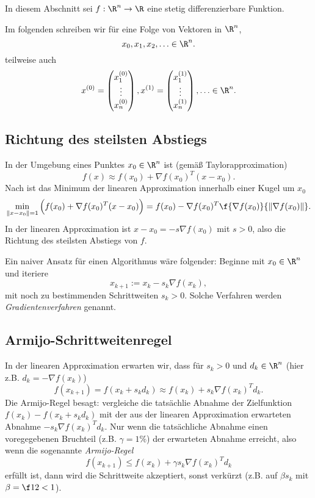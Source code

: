 In diesem Abschnitt sei $f: \R^n \to \R$ eine stetig differenzierbare Funktion.

\begin{conv*}
	Im folgenden schreiben wir für eine Folge von Vektoren in $\R^n$,
	\[
		x_0, x_1, x_2, \dotsc \in \R^n.
	\]
	teilweise auch
	\[
		x^{(0)} = \begin{pmatrix}
			x_1^{(0)} \\ \vdots \\ x_n^{(0)}
		\end{pmatrix},
		x^{(1)} = \begin{pmatrix}
			x_1^{(1)} \\ \vdots \\ x_n^{(1)}
		\end{pmatrix},
		\dotsc \in \R^n.
	\]
\end{conv*}

\subsection{Richtung des steilsten Abstiegs}

In der Umgebung eines Punktes $x_0 \in \R^n$ ist (gemäß Taylorapproximation)
\[
	f(x) \approx f(x_0) + \nabla f(x_0)^T (x-x_0).
\]
Nach 
ist das Minimum der linearen Approximation innerhalb einer Kugel um $x_0$
\[
	\min_{\|x-x_0\|=1} \Big( f(x_0) + \nabla f(x_0)^T (x-x_0) \Big)
	= f(x_0) - \nabla f(x_0)^T \f {\nabla f(x_0)}{\|\nabla f(x_0)\|}.
\]
In der linearen Approximation ist $x-x_0 = -s \nabla f(x_0)$ mit $s > 0$, also die Richtung des steilsten Abstiegs von $f$.

Ein naiver Ansatz für einen Algorithmus wäre folgender:
Beginne mit $x_0 \in \R^n$ und iteriere
\[
	x_{k+1} := x_k - s_k \nabla f(x_k),
\]
mit noch zu bestimmenden Schrittweiten $s_k > 0$.
Solche Verfahren werden \emph{Gradientenverfahren} genannt.

\subsection{Armijo-Schrittweitenregel}

In der linearen Approximation erwarten wir, dass für $s_k > 0$ und $d_k \in \R^n$ (hier z.B. $d_k = -\nabla f(x_k)$)
\[
	f(x_{k+1})
	= f(x_k + s_k d_k)
	\approx f(x_k) + s_k \nabla f(x_k)^T d_k.
\]
Die Armijo-Regel besagt:
vergleiche die tatsächlie Abnahme der Zielfunktion $f(x_k) - f(x_k + s_kd_k)$ mit der aus der linearen Approximation erwarteten Abnahme $-s_k \nabla f(x_k)^T d_k$.
Nur wenn die tatsächliche Abnahme einen voregegebenen Bruchteil (z.B. $\gamma = 1\%$) der erwarteten Abnahme erreicht, also wenn die sogenannte \emph{Armijo-Regel}
\[
	f(x_{k+1})
	\le f(x_k) + \gamma s_k \nabla f(x_k)^T d_k
\]
erfüllt ist, dann wird die Schrittweite akzeptiert, sonst verkürzt (z.B. auf $\beta s_k$ mit $\beta = \f 12 < 1$).

